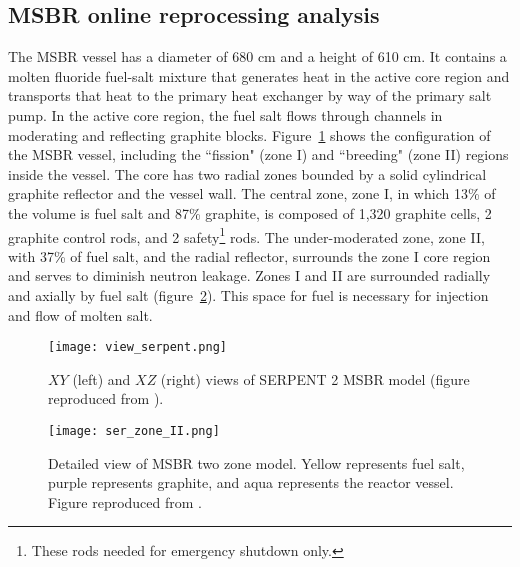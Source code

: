 \subsection{MSBR online reprocessing analysis} \label{sec:msbr_reproc}
The \gls{MSBR} vessel has a diameter of 680 cm and a height of 610 cm. It 
contains a molten fluoride fuel-salt mixture that generates heat in the active 
core region and transports that heat to the primary heat exchanger by way of 
the primary salt pump. In the active core region, the fuel salt flows through 
channels in moderating and reflecting graphite blocks. 
Figure~\ref{fig:serpent_plan_view} shows the configuration of the 
\gls{MSBR} vessel, including the ``fission" (zone I) and ``breeding" 
(zone II) regions inside the vessel. The core has two radial zones bounded by a 
solid cylindrical graphite reflector and the vessel wall. The central zone, 
zone I, in which 13\% of the volume is fuel salt and 87\% graphite, is
composed of 1,320 graphite cells, 2 graphite control rods, and 2 
safety\footnote{ These rods needed for emergency shutdown only.} rods. The 
under-moderated zone, zone II, with 37\% of fuel salt, and the radial reflector, 
surrounds the zone I core region and serves to diminish neutron leakage. Zones 
I and II are surrounded radially and axially by fuel salt 
(figure~\ref{fig:serpent_zoneII}). This space for fuel is necessary for 
injection and flow of molten salt.
\begin{figure}[hbp!] %
  \texttt{[image: view\_serpent.png]}
  \caption{$XY$ (left) and $XZ$ (right) views of SERPENT 2 \gls{MSBR} model 
(figure reproduced from \cite{rykhlevskii_full-core_2017}).}
  \label{fig:serpent_plan_view}
\end{figure}
\begin{figure}[t!] %
  \texttt{[image: ser\_zone\_II.png]}
  \caption{Detailed view of \gls{MSBR} two zone model. 
          Yellow represents fuel salt, purple represents graphite, and aqua represents the reactor vessel. Figure reproduced from \cite{rykhlevskii_full-core_2017}.}
  \label{fig:serpent_zoneII}
\end{figure}

